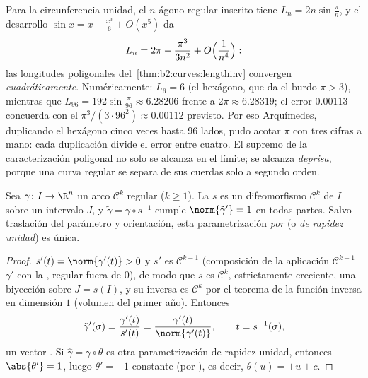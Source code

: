 \begin{example}\label{ex:b2:curves:archimedes}
Para la circunferencia unidad, el $n$-ágono regular inscrito tiene
 $L_n = 2n\sin\frac\pi n$, y el desarrollo $\sin x = x -
\frac{x^3}6 + O(x^5)$ da
\[
L_n = 2\pi - \frac{\pi^3}{3n^2} + O\Bigl(\frac1{n^4}\Bigr) :
\]
las longitudes poligonales del~\cref{thm:b2:curves:lengthinv}
convergen \emph{cuadráticamente}. Numéricamente: $L_6 = 6$ (el
hexágono, que da el burdo $\pi > 3$), mientras que $L_{96} =
192\sin\frac{\pi}{96} \approx 6.28206$ frente a $2\pi \approx
6.28319$; el error $0.00113$ concuerda con el $\pi^3/(3\cdot96^2)
\approx 0.00112$ previsto. Por eso Arquímedes, duplicando el
hexágono cinco veces hasta $96$ lados, pudo acotar $\pi$ con tres
cifras a mano: cada duplicación divide el error entre cuatro. El
supremo de la caracterización poligonal no solo se alcanza en el
límite; se alcanza \emph{deprisa}, porque una curva regular se
separa de sus cuerdas solo a segundo orden.
\end{example}

\begin{theorem}\label{thm:b2:curves:arclength}
Sea $\gamma \colon I \to \R^n$ un arco $\mathcal{C}^k$ regular ($k
\geq 1$). La  $s$ es un difeomorfismo
$\mathcal{C}^k$ de $I$ sobre un intervalo $J$, y $\tilde\gamma =
\gamma \circ s^{-1}$ cumple $\norm{\tilde\gamma'} = 1$ en todas
partes. Salvo traslación del parámetro y orientación, esta
parametrización \emph{por } (o \emph{de rapidez
unidad}) es única.
\end{theorem}

\begin{proof}
$s'(t) = \norm{\gamma'(t)} > 0$ y $s'$ es $\mathcal{C}^{k-1}$
(composición de la aplicación $\mathcal{C}^{k-1}$ $\gamma'$ con la
, regular fuera de $0$), de modo que $s$ es $\mathcal{C}^k$,
estrictamente creciente, una biyección sobre $J = s(I)$, y su
inversa es $\mathcal{C}^k$ por el teorema de la función inversa en
dimensión $1$ (volumen del primer año). Entonces
\[
\tilde\gamma'(\sigma)
= \frac{\gamma'(t)}{s'(t)}
= \frac{\gamma'(t)}{\norm{\gamma'(t)}},
\qquad t = s^{-1}(\sigma),
\]
un vector . Si $\hat\gamma = \gamma\circ\theta$ es otra
parametrización de rapidez unidad, entonces $\abs{\theta'} = 1$,
luego $\theta' = \pm 1$ constante (por ), es decir,
$\theta(u) = \pm u + c$.
\end{proof}

